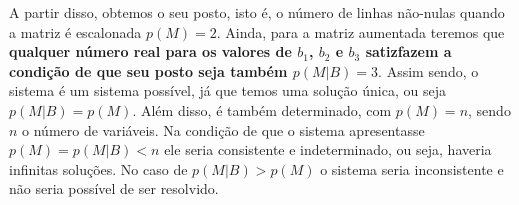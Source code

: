 A partir disso, obtemos o seu posto, isto é, o número de linhas não-nulas quando a matriz é escalonada $p(M) = 2$. Ainda, para a matriz aumentada teremos que \textbf{qualquer número real para os valores de $b_1$, $b_2$ e $b_3$ satizfazem a condição de que seu posto seja também $p(M|B) = 3$}. Assim sendo, o sistema é um sistema possível, já que temos uma solução única, ou seja $p(M|B) = p(M)$. Além disso, é também determinado, com $p(M)=n$, sendo $n$ o número de variáveis. Na condição de que o sistema apresentasse $p(M)=p(M|B)<n$ ele seria consistente e indeterminado, ou seja, haveria infinitas soluções. No caso de $p(M|B)>p(M)$ o sistema seria inconsistente e não seria possível de ser resolvido.
\\